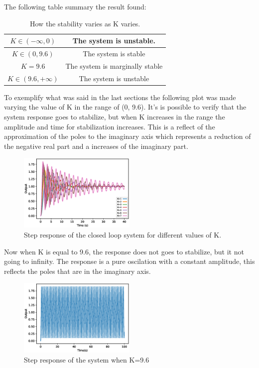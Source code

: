 \documentclass[a4paper]{article}
\begin{document}
The following table summary the result found:
\begin{table}[H]
\centering
\begin{tabular}{|c|c|}
\hline
$K \in(-\infty,0)$& The system is unstable.\\
\hline
$K \in (0,9.6)$ & The system is stable\\
\hline
$K =9.6$ & The system is marginally stable\\
\hline
$K \in (9.6,+\infty)$& The system is unstable\\
\hline
\end{tabular}
\caption{How the stability varies as K varies. }
\end{table}
To exemplify what was said in the last sections the following plot was made varying the value of K in the range of (0, 9.6). It's is possible to verify that the system response goes to stabilize, but when K increases in the range the amplitude and time for stabilization increases. This is a reflect of the approximation of the poles to the imaginary axis which represents a reduction of the negative real part and a increases of the imaginary part.
\begin{figure}[H]
\centering
\includegraphics[width=0.5\textwidth]{Figures/Question4/EXE_4_MULTIPLE_PLOTS.eps}
\caption{Step response of the closed loop system for different values of K.}
\end{figure}
Now when K is equal to 9.6, the response does not goes to stabilize, but it not going to infinity. The response is a pure oscilation with a constant amplitude, this reflects the poles that are in the imaginary axis.
\begin{figure}[H]
\centering
\includegraphics[width=0.5\textwidth]{Figures/Question4/EXE_4_ITEM_5}
\caption{Step response of the system when K=9.6}
\end{figure}
\end{document}
